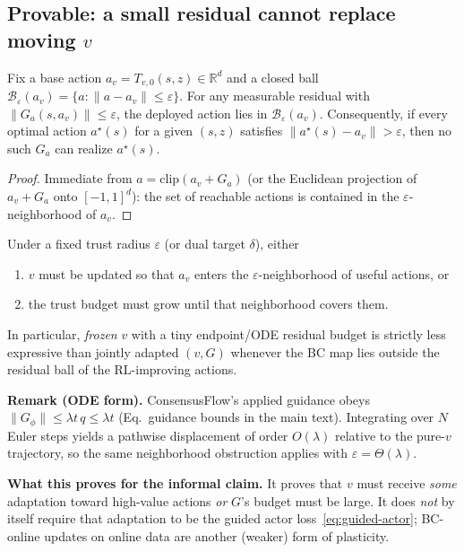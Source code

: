 \subsection{Provable: a small residual cannot replace moving $v$}
\label{subsec:budget}

\begin{proposition}
\label{prop:budget}
Fix a base action $a_v=T_{v,0}(s,z)\in\mathbb{R}^d$ and a closed ball
$\mathcal{B}_\varepsilon(a_v)=\{a:\|a-a_v\|\le\varepsilon\}$.
For any measurable residual with $\|G_a(s,a_v)\|\le\varepsilon$,
the deployed action lies in $\mathcal{B}_\varepsilon(a_v)$.
Consequently, if every optimal action $a^\star(s)$ for a given $(s,z)$ satisfies
$\|a^\star(s)-a_v\|>\varepsilon$, then no such $G_a$ can realize $a^\star(s)$.
\end{proposition}

\begin{proof}
Immediate from $a=\mathrm{clip}(a_v+G_a)$ (or the Euclidean projection of
$a_v+G_a$ onto $[-1,1]^d$): the set of reachable actions is contained in the
$\varepsilon$-neighborhood of $a_v$.
\end{proof}

\begin{corollary}
\label{cor:plastic}
Under a fixed trust radius $\varepsilon$ (or dual target $\delta$), either
\begin{enumerate}
  \item $v$ must be updated so that $a_v$ enters the $\varepsilon$-neighborhood of
  useful actions, or
  \item the trust budget must grow until that neighborhood covers them.
\end{enumerate}
In particular, \emph{frozen} $v$ with a tiny endpoint/ODE residual budget is
strictly less expressive than jointly adapted $(v,G)$ whenever the BC map lies
outside the residual ball of the RL-improving actions.
\end{corollary}

\noindent\textbf{Remark (ODE form).}
ConsensusFlow's applied guidance obeys $\|G_\phi\|\le\lambda t\,q\le\lambda t$
(Eq.~guidance bounds in the main text). Integrating over $N$ Euler steps yields
a pathwise displacement of order $O(\lambda)$ relative to the pure-$v$ trajectory,
so the same neighborhood obstruction applies with $\varepsilon=\Theta(\lambda)$.

\noindent\textbf{What this proves for the informal claim.}
It proves that $v$ must receive \emph{some} adaptation toward high-value actions
\emph{or} $G$'s budget must be large. It does \emph{not} by itself require that
adaptation to be the guided actor loss~\eqref{eq:guided-actor}; BC-online updates
on online data are another (weaker) form of plasticity.

